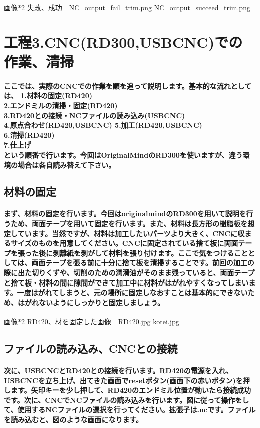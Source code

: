 \documentclass[b5paper, 9pt, twocolumn, titlepage,openany]{jsbook}%
\begin{document}
画像*2 失敗、成功　NC_output_fail_trim.png NC_output_succeed_trim.png


\section{工程3.CNC(RD300,USBCNC)での作業、清掃}
\paragraph{ここでは、実際のCNCでの作業を順を追って説明します。基本的な流れとしては、
1.材料の固定(RD420)\\
2.エンドミルの清掃・固定(RD420)\\
3.RD420との接続・NCファイルの読み込み(USBCNC)\\
4.原点合わせ(RD420,USBCNC)
5.加工(RD420,USBCNC)\\
6.清掃(RD420)\\
7.仕上げ\\
という順番で行います。今回はOriginalMindのRD300を使いますが、違う環境の場合は各自読み替えて下さい。}
\subsection{材料の固定}
\paragraph{まず、材料の固定を行います。今回はoriginalmindのRD300を用いて説明を行うため、両面テープを用いて固定を行います。また、材料は長方形の樹脂板を想定しています。当然ですが、材料は加工したいパーツより大きく、CNCに収まるサイズのものを用意してください。CNCに固定されている捨て板に両面テープを張った後に剥離紙を剥がして材料を張り付けます。ここで気をつけることとしては、両面テープを張る前に十分に捨て板を清掃することです。前回の加工の際に出た切りくずや、切削のための潤滑油がそのまま残っていると、両面テープと捨て板・材料の間に隙間ができて加工中に材料がはがれやすくなってしまいます。一度はがれてしまうと、元の場所に固定しなおすことは基本的にできないため、はがれないようにしっかりと固定しましょう。}

画像*2 RD420、材を固定した画像　RD420.jpg kotei.jpg

\subsection{ファイルの読み込み、CNCとの接続}
\paragraph{次に、USBCNCとRD420との接続を行います。RD420の電源を入れ、USBCNCを立ち上げ、出てきた画面でresetボタン(画面下の赤いボタン)を押します。矢印キーを少し押して、RD420のエンドミル位置が動いたら接続成功です。次に、CNCでNCファイルの読み込みを行います。図に従って操作をして、使用するNCファイルの選択を行ってください。拡張子は.ncです。ファイルを読み込むと、図のような画面になります。}
\end{document}
